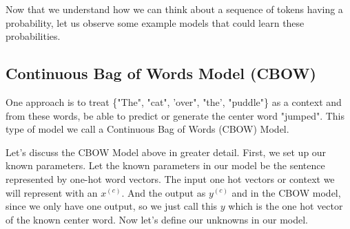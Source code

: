 \documentclass[nobib]{tufte-handout}
\begin{document}
Now that we understand how we can think about a sequence of tokens having a probability, let us observe some example models that could learn these probabilities.

\subsection{Continuous Bag of Words Model (CBOW)}

One approach is to treat \{"The", "cat", 'over", "the', "puddle"\} as a context and from these words, be able to predict or generate the center word "jumped". This type of model we call a Continuous Bag of Words (CBOW) Model.


Let's discuss the CBOW Model above in greater detail. First, we set up our known parameters. Let the known parameters in our model be the sentence represented by one-hot word vectors. The input one hot vectors or context we will represent with an $x^{(c)}$. And the output as $y^{(c)}$ and in the CBOW model, since we only have one output, so we just call this $y$ which is the one hot vector of the known center word. Now let's define our unknowns in our model. 

\end{document}
